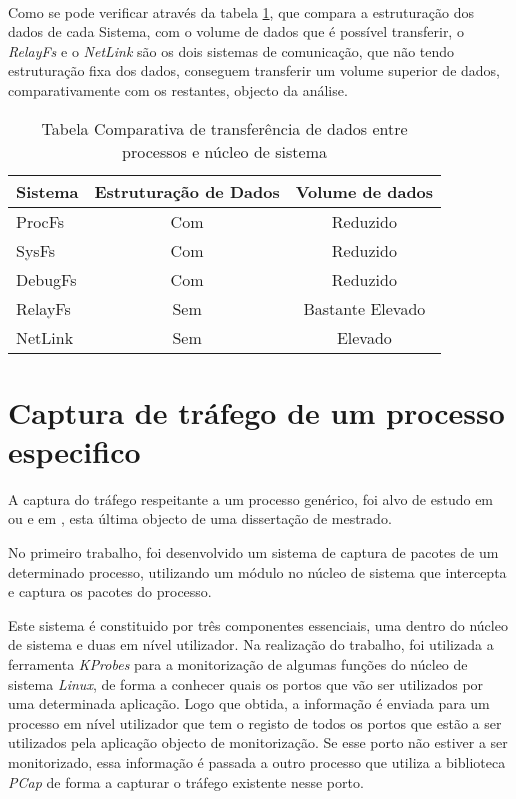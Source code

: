 \paragraph*{}
Como se pode verificar através da tabela \ref{tab:transf_compare}, que compara a estruturação dos dados de cada Sistema, com o volume de dados que é possível transferir, o \textit{RelayFs} e o \textit{NetLink} são os dois sistemas de comunicação, que não tendo estruturação fixa dos dados, conseguem transferir um volume superior de dados, comparativamente com os restantes, objecto da análise.

\begin{table}[!htbp]
\begin{center}
\begin{tabular}{|l||c|c|}
\hline
Sistema & Estruturação de Dados & Volume de dados \\
\hline
ProcFs & Com & Reduzido \\
\hline
SysFs & Com & Reduzido \\
\hline
DebugFs & Com & Reduzido \\
\hline
RelayFs & Sem & Bastante Elevado \\
\hline
NetLink & Sem & Elevado \\
\hline
\end{tabular}
\caption{Tabela Comparativa de transferência de dados entre processos e núcleo de sistema}
\label{tab:transf_compare}
\end{center}
\end{table}
 
\section{Captura de tráfego de um processo especifico}
\label{sect:outras_abordagens}

A captura do tráfego respeitante a um processo genérico, foi alvo de estudo em \cite{1688981} ou e em \cite{Farruca:2009}, esta última objecto de uma dissertação de mestrado.

No primeiro trabalho, foi desenvolvido um sistema de captura de pacotes de um determinado processo, utilizando um módulo no núcleo de sistema que intercepta e captura os pacotes do processo.

Este sistema é constituido por três componentes essenciais, uma dentro do núcleo de sistema e duas em nível utilizador.
Na realização do trabalho, foi utilizada a ferramenta \textit{KProbes} para a monitorização de algumas funções do núcleo de sistema \textit{Linux}, de forma a conhecer quais os portos que vão ser utilizados por uma determinada aplicação.
Logo que obtida, a informação é enviada para um processo em nível utilizador que tem o registo de todos os portos que estão a ser utilizados pela aplicação objecto de monitorização.
Se esse porto não estiver a ser monitorizado, essa informação é passada a outro processo que utiliza a biblioteca \textit{PCap} de forma a capturar o tráfego existente nesse porto.


